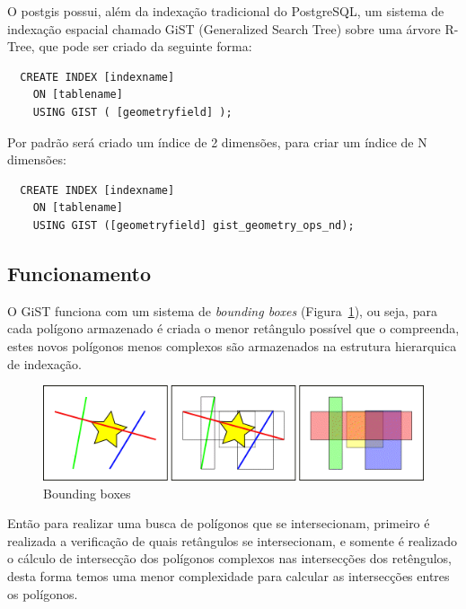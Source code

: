 \documentclass[12pt]{article}
\begin{document}
O postgis possui, além da indexação tradicional do PostgreSQL, um sistema de
indexação espacial chamado GiST (Generalized Search Tree) \cite{gist:96} sobre uma
árvore R-Tree, que pode ser criado da seguinte forma:
\begin{verbatim}
  CREATE INDEX [indexname]
    ON [tablename]
    USING GIST ( [geometryfield] );
\end{verbatim}

Por padrão será criado um índice de 2 dimensões, para criar um índice de N dimensões:
\begin{verbatim}
  CREATE INDEX [indexname]
    ON [tablename]
    USING GIST ([geometryfield] gist_geometry_ops_nd);
\end{verbatim}

\subsection{Funcionamento}
O GiST funciona com um sistema de \textit{bounding boxes} (Figura~\ref{fig:indexes_bbox}),
ou seja, para cada polígono armazenado é criada o menor retângulo possível que o
compreenda, estes novos polígonos menos complexos são armazenados na estrutura hierarquica
de indexação.

\begin{figure}[ht]
  \centering
  \includegraphics[width=1\textwidth]{indexes_bbox.png}
  \caption{Bounding boxes}
  \label{fig:indexes_bbox}
\end{figure}

Então para realizar uma busca de polígonos que se intersecionam, primeiro é realizada a
verificação de quais retângulos se intersecionam, e somente é realizado o cálculo de
intersecção dos polígonos complexos nas intersecções dos retêngulos, desta forma temos uma
menor complexidade para calcular as intersecções entres os polígonos.
\end{document}

